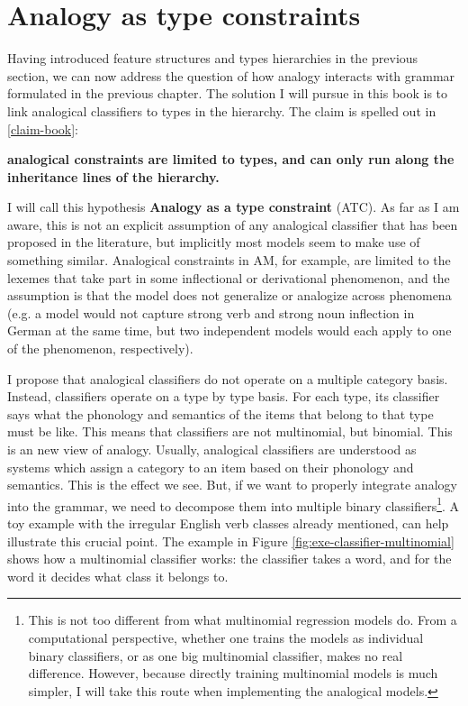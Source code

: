 
\section{Analogy as type constraints}


Having introduced feature structures and types hierarchies in the previous section, we can now address the question of how analogy interacts with grammar formulated in the previous chapter. The solution I will pursue in this book is to link analogical classifiers to types in the hierarchy. The claim is spelled out in \ref{claim-book}:

\begin{exe}
    \ex \label{claim-book} \textbf{analogical constraints are limited to types, and can only run along the inheritance lines of the hierarchy.}
\end{exe}

I will call this hypothesis \textbf{Analogy as a type constraint} (ATC). As far as I am aware, this is not an explicit assumption of any analogical classifier that has been proposed in the literature, but implicitly most models seem to make use of something similar. Analogical constraints in AM, for example, are limited to the lexemes that take part in some inflectional or derivational phenomenon, and the assumption is that the model does not generalize or analogize across phenomena (e.g. a model would not capture strong verb and strong noun inflection in German at the same time, but two independent models would each apply to one of the phenomenon, respectively).

I propose that analogical classifiers do not operate on a multiple category basis. Instead, classifiers operate on a type by type basis. For each type, its classifier says what the phonology and semantics of the items that belong to that type must be like. This means that classifiers are not multinomial, but binomial. This is an new view of analogy. Usually, analogical classifiers are understood as systems which assign a category to an item based on their phonology and semantics. This is the effect we see. But, if we want to properly integrate analogy into the grammar, we need to decompose them into multiple binary classifiers\footnote{This is not too different from what multinomial regression models do. From a computational perspective, whether one trains the models as individual binary classifiers, or as one big multinomial classifier, makes no real difference. However, because directly training multinomial models is much simpler, I will take this route when implementing the analogical models.}. A toy example with the irregular English verb classes already mentioned, can help illustrate this crucial point. The example in Figure \ref{fig:exe-classifier-multinomial} shows how a multinomial classifier works: the classifier takes a word, and for the word it decides what class it belongs to.

